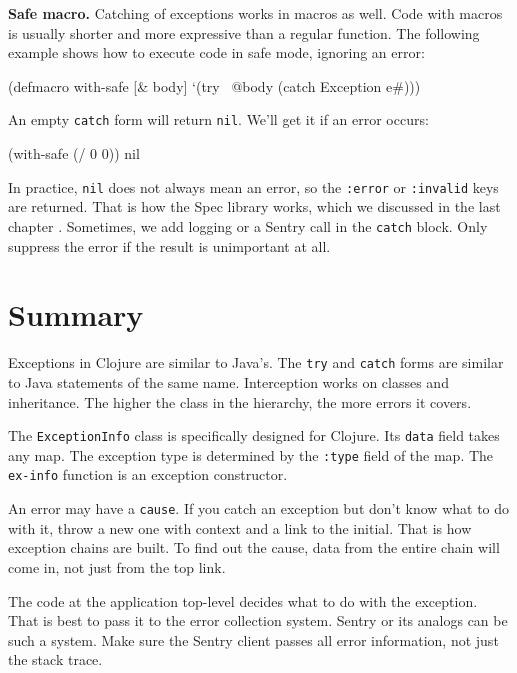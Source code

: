 \fi

\textbf{Safe macro.} Catching of exceptions works in macros as well. Code with macros is usually shorter and more expressive than a regular function. The following example shows how to execute code in safe mode, ignoring an error:


\begin{clojure}
(defmacro with-safe [& body]
  `(try
     ~@body
     (catch Exception e#)))
\end{clojure}

\noindent
An empty \verb|catch| form will return \verb|nil|. We'll get it if an error occurs:

\begin{clojure}
(with-safe (/ 0 0))
nil
\end{clojure}

In practice, \verb|nil| does not always mean an error, so the \verb|:error| or \verb|:invalid| keys are returned. That is how the Spec library works, which we discussed in the last chapter . Sometimes, we add logging or a Sentry call in the \verb|catch| block. Only suppress the error if the result is unimportant at all.

\section{Summary}

Exceptions in Clojure are similar to Java's. The \verb|try| and \verb|catch| forms are similar to Java statements of the same name. Interception works on classes and inheritance. The higher the class in the hierarchy, the more errors it covers.

The \verb|ExceptionInfo| class is specifically designed for Clojure. Its \verb|data| field takes any map. The exception type is determined by the \verb|:type| field of the map. The \verb|ex-info| function is an exception constructor.

An error may have a \verb|cause|. If you catch an exception but don't know what to do with it, throw a new one with context and a link to the initial. That is how exception chains are built. To find out the cause, data from the entire chain will come in, not just from the top link.

The code at the application top-level decides what to do with the exception.
That is best to pass it to the error collection system. Sentry or its analogs can be such a system. Make sure the Sentry client passes all error information, not just the stack trace.

